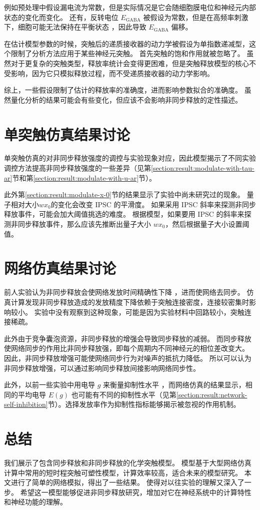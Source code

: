 例如预处理中假设漏电流为常数，但是实际情况是它会随细胞膜电位和神经元内部状态的变化而变化。
还有，反转电位 $E_\text{GABA}$ 被假设为常数，但是在高频率刺激下，细胞可能无法保持在平衡状态 \cite{Staley1995}，因此导致 $E_\text{GABA}$ 偏移。

在估计模型参数的时候，突触后的递质接收器的动力学被假设为单指数递减型，这个限制了分析方法应用于某些神经元突触。
首先突触的饱和作用就被忽略了。
虽然对于更复杂的突触类型，释放率统计会变得更困难，但是突触释放模型的核心不受影响，因为它只模拟释放过程，而不受递质接收器的动力学影响。

综上，一些假设限制了估计的释放率的准确度，进而影响参数拟合的准确度。
虽然量化分析的结果可能会有些变化，但应该不会影响非同步释放的定性描述。

\section{单突触仿真结果讨论}
\label{section:discussion:synapse-simulation}
单突触仿真的对非同步释放强度的调控与实验现象对应，因此模型揭示了不同实验调控方法提高非同步释放强度的一些差异（见第\ref{section:result:modulate-with-tau-ar}节和第\ref{section:result:modulate-with-u-ar}节）。

此外第\ref{section:result:modulate-x-0}节的结果显示了实验中尚未研究过的现象。
量子相对大小$wx_0$的变化会改变 IPSC 的平滑度。
如果采用 IPSC 斜率来探测非同步释放事件，可能会加大阈值挑选的难度。
根据模型，如果要用 IPSC 的斜率来探测非同步释放事件，那么应该先推断出量子大小 $wx_0$，然后根据量子大小设置阈值。

\section{网络仿真结果讨论}
\label{section:discussion:network-simulation}
前人实验认为非同步释放会使网络发放时间精确性下降 \cite{Manseau2010}，进而使网络去同步。
仿真计算发现非同步释放造成的发放精度下降依赖于突触连接密度，连接较密集时影响较小。
实验中没有观察到这种现象，可能是因为实验材料中回路较小，突触连接稀疏。

此外由于竞争囊泡资源，非同步释放的增强会导致同步释放的减弱。
而同步释放使网络同步的作用比非同步释放强，即每个周期内不同神经元的相位差改变大。
因此，非同步释放增强可能使网络同步行为对噪声的抵抗力降低。
所以可以认为非同步释放增强，可以通过影响同步释放间接影响网络同步性。

此外，以前一些实验中用电导 $g$ 来衡量抑制性水平 \cite{Wang1996,Voegtlin2007}，而网络仿真的结果显示，相同的平均电导 $E(g)$ 也可能有不同的抑制性水平（见第\ref{section:result:network-self-inhibition}节）。选择发放率作为抑制性指标能够揭示被忽视的作用机制。

\section{总结}
我们展示了包含同步释放和非同步释放的化学突触模型。
模型基于大型网络仿真计算中常用的短时程突触可塑性模型，计算效率较高，适合未来的模型研究。
本文进行了简单的网络模拟，得出了一些结果。
使得对以往实验的理解又深入了一步。
希望这一模型能够促进非同步释放研究，增加对它在神经系统中的计算特性和神经功能的理解。
